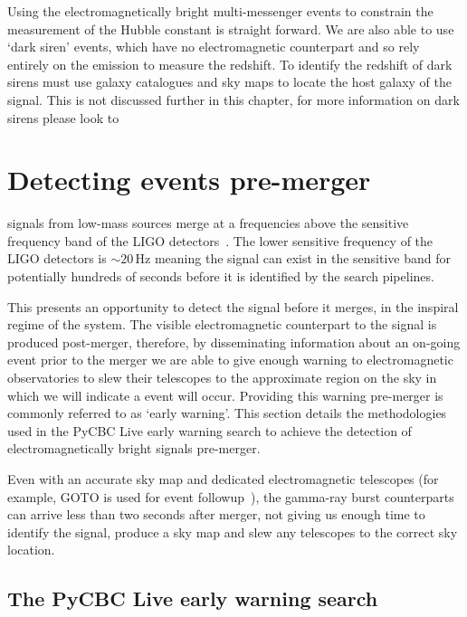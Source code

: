 Using the electromagnetically bright multi-messenger events to constrain the measurement of the Hubble constant is straight forward. We are also able to use `dark siren' events, which have no electromagnetic counterpart and so rely entirely on the \gwadj emission to measure the redshift. To identify the redshift of dark sirens must use galaxy catalogues and \gwadj sky maps to locate the host galaxy of the \gwadj signal. This is not discussed further in this chapter, for more information on dark sirens please look to~\cite{DES:2019, Dalang_dark_sirens:2023}

\section{\label{6:sec:early-warning-search}Detecting \gwadj events pre-merger}

\Gwadj signals from low-mass sources merge at a frequencies above the sensitive frequency band of the LIGO \gwadj detectors~\cite{aLIGO_design_curve:2018}. The lower sensitive frequency of the LIGO detectors is ${\sim}20 \, \text{Hz}$ meaning the \gwadj signal can exist in the sensitive band for potentially hundreds of seconds before it is identified by the \gwadj search pipelines.

This presents an opportunity to detect the \gwadj signal before it merges, in the inspiral regime of the system. The visible electromagnetic counterpart to the \gwadj signal is produced post-merger, therefore, by disseminating information about an on-going \gwadj event prior to the merger we are able to give enough warning to electromagnetic observatories to slew their telescopes to the approximate region on the sky in which we will indicate a \gwadj event will occur. Providing this warning pre-merger is commonly referred to as `early warning'. This section details the methodologies used in the PyCBC Live early warning search to achieve the detection of electromagnetically bright \gwadj signals pre-merger.

Even with an accurate sky map and dedicated electromagnetic telescopes (for example, GOTO is used for \gwadj event followup~\cite{GOTO:2020}), the gamma-ray burst counterparts can arrive less than two seconds after merger, not giving us enough time to identify the signal, produce a sky map and slew any telescopes to the correct sky location.

\subsection{\label{6:sec:pycbc-ew-search}The PyCBC Live early warning search}

